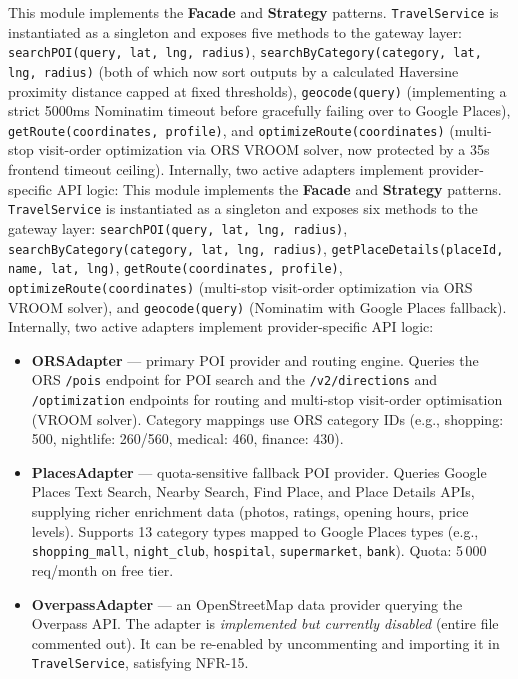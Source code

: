 \documentclass[12pt, a4paper]{article}
\begin{document}
This module implements the \textbf{Facade} and \textbf{Strategy} patterns. \texttt{TravelService} is instantiated as a singleton and exposes five methods to the gateway layer: \texttt{searchPOI(query, lat, lng, radius)}, \texttt{searchByCategory(category, lat, lng, radius)} (both of which now sort outputs by a calculated Haversine proximity distance capped at fixed thresholds), \texttt{geocode(query)} (implementing a strict 5000ms Nominatim timeout before gracefully failing over to Google Places), \texttt{getRoute(coordinates, profile)}, and \texttt{optimizeRoute(coordinates)} (multi-stop visit-order optimization via ORS VROOM solver, now protected by a 35s frontend timeout ceiling). Internally, two active adapters implement provider-specific API logic:
This module implements the \textbf{Facade} and \textbf{Strategy} patterns. \texttt{TravelService} is instantiated as a singleton and exposes six methods to the gateway layer: \texttt{searchPOI(query, lat, lng, radius)}, \texttt{searchByCategory(category, lat, lng, radius)}, \texttt{getPlaceDetails(placeId, name, lat, lng)}, \texttt{getRoute(coordinates, profile)}, \texttt{optimizeRoute(coordinates)} (multi-stop visit-order optimization via ORS VROOM solver), and \texttt{geocode(query)} (Nominatim with Google Places fallback). Internally, two active adapters implement provider-specific API logic:

\begin{itemize}
  \item \textbf{ORSAdapter} --- primary POI provider and routing engine. Queries the ORS \texttt{/pois} endpoint for POI search and the \texttt{/v2/directions} and \texttt{/optimization} endpoints for routing and multi-stop visit-order optimisation (VROOM solver). Category mappings use ORS category IDs (e.g., shopping: 500, nightlife: 260/560, medical: 460, finance: 430).
  \item \textbf{PlacesAdapter} --- quota-sensitive fallback POI provider. Queries Google Places Text Search, Nearby Search, Find Place, and Place Details APIs, supplying richer enrichment data (photos, ratings, opening hours, price levels). Supports 13 category types mapped to Google Places types (e.g., \texttt{shopping\_mall}, \texttt{night\_club}, \texttt{hospital}, \texttt{supermarket}, \texttt{bank}). Quota: 5\,000 req/month on free tier.
  \item \textbf{OverpassAdapter} --- an OpenStreetMap data provider querying the Overpass API. The adapter is \emph{implemented but currently disabled} (entire file commented out). It can be re-enabled by uncommenting and importing it in \texttt{TravelService}, satisfying NFR-15.
\end{itemize}
\end{document}
